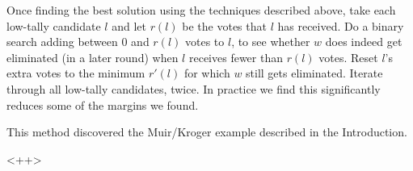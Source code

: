 \documentclass[10pt,a4paper]{article}
\newcommand{\VTNote}[1]{}
\begin{document}
{Once finding the best solution using the techniques described above, take each low-tally candidate $l$ and let $r(l)$ be the votes that $l$ has received.  Do a binary search adding between 0 and $r(l)$ votes to $l$, to see whether $w$ does indeed get eliminated (in a later round) when $l$ receives fewer than $r(l)$ votes.  Reset $l$'s extra votes to the minimum $r'(l)$ for which $w$ still gets eliminated.  Iterate through all low-tally candidates, twice.  In practice we find this significantly reduces some of the margins we found.

This method discovered the Muir/Kroger example described in the Introduction.

\VTNote{I reckon we need a table like Michelle's table, listing apparent (last round) margin, margin by changing first pref's, margin without changing first pref's, and optimized margin, for a few key races from 2013 and 2016.}<++>

} %
\end{document}
